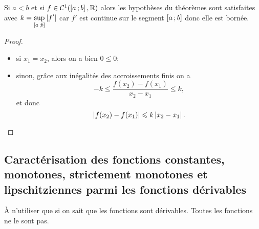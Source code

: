 Si \(a < b\) et si \(f \in \mathcal{C}^{1}(\left[ a \, ; {} b \right], \mathbb{R})\) alors les
hypothèses du théorèmes sont satisfaites avec
\(k=\sup\limits_{\left[ a \, ; {} b \right]}\left\lvert f'\right\rvert\) car \(f'\) est continue sur le
segment \(\left[ a \, ; {} b \right]\) donc elle est bornée.

\begin{proof}
  \begin{itemize}
    \item si \(x_1=x_2\), alors on a bien \(0 \leqslant 0\);
    \item sinon, grâce aux inégalités des accroissements finis on a
      \begin{equation}
        -k \leqslant \frac{f(x_2)-f(x_1)}{x_2-x_1} \leqslant k,
      \end{equation}
      et donc
      \begin{equation}
        \left\lvert f(x_2)-f(x_1)\right\rvert \leqslant k\left\lvert x_2-x_1\right\rvert.
      \end{equation}
  \end{itemize}
\end{proof}

\subsection{Caractérisation des fonctions constantes, monotones, strictement
monotones et lipschitziennes parmi les fonctions dérivables}

À n'utiliser que si on sait que les fonctions sont dérivables. Toutes les
fonctions ne le sont pas.

